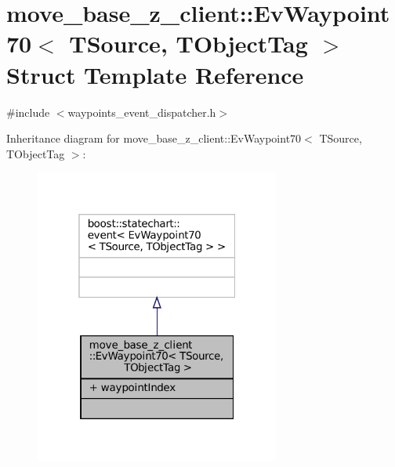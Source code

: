 \hypertarget{structmove__base__z__client_1_1EvWaypoint70}{}\section{move\+\_\+base\+\_\+z\+\_\+client\+:\+:Ev\+Waypoint70$<$ T\+Source, T\+Object\+Tag $>$ Struct Template Reference}
\label{structmove__base__z__client_1_1EvWaypoint70}


{\ttfamily \#include $<$waypoints\+\_\+event\+\_\+dispatcher.\+h$>$}



Inheritance diagram for move\+\_\+base\+\_\+z\+\_\+client\+:\+:Ev\+Waypoint70$<$ T\+Source, T\+Object\+Tag $>$\+:
\nopagebreak
\begin{figure}[H]
\begin{center}
\leavevmode
\includegraphics[width=229pt]{structmove__base__z__client_1_1EvWaypoint70__inherit__graph}
\end{center}
\end{figure}


